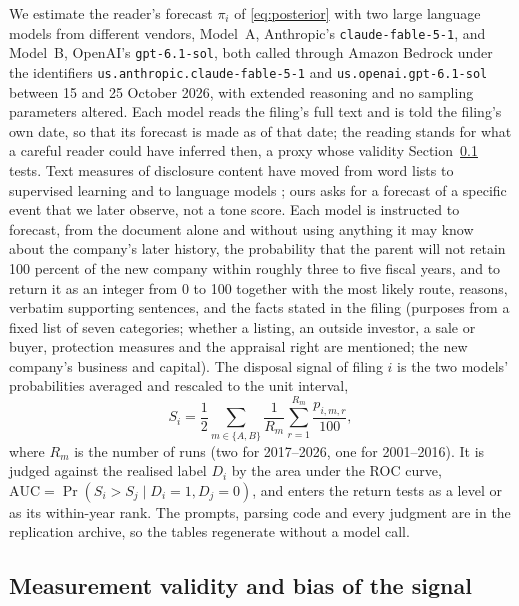 We estimate the reader's forecast $\pi_i$ of \eqref{eq:posterior} with two large language models from different vendors, Model~A, Anthropic's \texttt{claude-fable-5-1}, and Model~B, OpenAI's \texttt{gpt-6.1-sol}, both called through Amazon Bedrock under the identifiers \texttt{us.anthropic.claude-fable-5-1} and \texttt{us.openai.gpt-6.1-sol} between 15 and 25 October 2026, with extended reasoning and no sampling parameters altered. Each model reads the filing's full text and is told the filing's own date, so that its forecast is made as of that date; the reading stands for what a careful reader could have inferred then, a proxy whose validity Section~\ref{sec:validity} tests. Text measures of disclosure content have moved from word lists \cite{loughran2011} to supervised learning \cite{frankel2022} and to language models \cite{siano2025}; ours asks for a forecast of a specific event that we later observe, not a tone score. Each model is instructed to forecast, from the document alone and without using anything it may know about the company's later history, the probability that the parent will not retain 100 percent of the new company within roughly three to five fiscal years, and to return it as an integer from 0 to 100 together with the most likely route, reasons, verbatim supporting sentences, and the facts stated in the filing (purposes from a fixed list of seven categories; whether a listing, an outside investor, a sale or buyer, protection measures and the appraisal right are mentioned; the new company's business and capital). The disposal signal of filing $i$ is the two models' probabilities averaged and rescaled to the unit interval,
\begin{equation}\label{eq:signal}
S_i = \frac{1}{2}\sum_{m\in\{A,B\}}\frac{1}{R_m}\sum_{r=1}^{R_m}\frac{p_{i,m,r}}{100},
\end{equation}
where $R_m$ is the number of runs (two for 2017--2026, one for 2001--2016). It is judged against the realised label $D_i$ by the area under the ROC curve, $\mathrm{AUC} = \Pr(S_i > S_j \mid D_i = 1, D_j = 0)$, and enters the return tests as a level or as its within-year rank. The prompts, parsing code and every judgment are in the replication archive, so the tables regenerate without a model call.

\subsection{Measurement validity and bias of the signal}\label{sec:validity}

